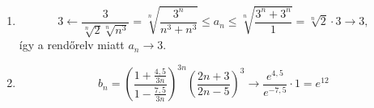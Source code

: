 \documentclass[11pt]{scrartcl}
\begin{document}
\begin{enumerate}
	\item \[
		      3
		      \leftarrow \frac{3}{\sqrt[n]{2} \sqrt[n]{n^3}}
		      = \sqrt[n]{\frac{3^n}{n^3 + n^3}}
		      \le a_n
		      \le \sqrt[n]{\frac{3^n + 3^n}{1}}
		      = \sqrt[n]{2} \cdot 3 \to 3,
	      \]
	      így a rendőrelv miatt $a_n \to 3$.

	\item \[
		      b_n
		      = \left( \frac{1 + \frac{4{,}5}{3n}}{1 - \frac{7{,}5}{3n}} \right)^{3n}
		      \left( \frac{2n + 3}{2n - 5} \right)^3
		      \to \frac{e^{4{,}5}}{e^{-7{,}5}} \cdot 1
		      = e^{12}
	      \]
\end{enumerate}
\end{document}
